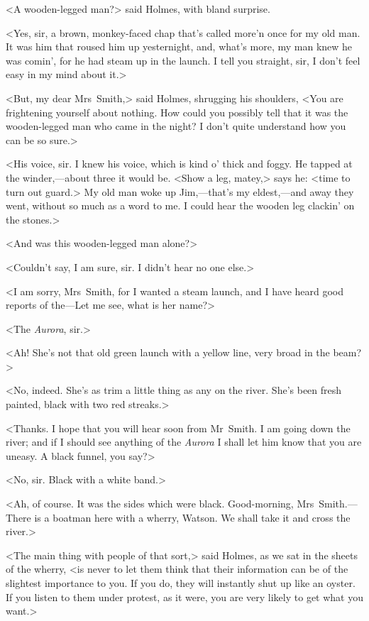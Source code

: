 <A wooden-legged man?> said Holmes, with bland surprise.

<Yes, sir, a brown, monkey-faced chap that's called more'n once for my old man. It was him that roused him up yesternight, and, what's more, my man knew he was comin', for he had steam up in the launch. I tell you straight, sir, I don't feel easy in my mind about it.>

<But, my dear Mrs~Smith,> said Holmes, shrugging his shoulders, <You are frightening yourself about nothing. How could you possibly tell that it was the wooden-legged man who came in the night? I don't quite understand how you can be so sure.>

<His voice, sir. I knew his voice, which is kind o' thick and foggy. He tapped at the winder,—about three it would be. <Show a leg, matey,> says he: <time to turn out guard.> My old man woke up Jim,—that's my eldest,—and away they went, without so much as a word to me. I could hear the wooden leg clackin' on the stones.>

<And was this wooden-legged man alone?>

<Couldn't say, I am sure, sir. I didn't hear no one else.>

<I am sorry, Mrs~Smith, for I wanted a steam launch, and I have heard good reports of the—Let me see, what is her name?>

<The \textit{Aurora}, sir.>

<Ah! She's not that old green launch with a yellow line, very broad in the beam?>

<No, indeed. She's as trim a little thing as any on the river. She's been fresh painted, black with two red streaks.>

<Thanks. I hope that you will hear soon from Mr~Smith. I am going down the river; and if I should see anything of the \textit{Aurora} I shall let him know that you are uneasy. A black funnel, you say?>

<No, sir. Black with a white band.>

<Ah, of course. It was the sides which were black. Good-morning, Mrs~Smith.—There is a boatman here with a wherry, Watson. We shall take it and cross the river.>

<The main thing with people of that sort,> said Holmes, as we sat in the sheets of the wherry, <is never to let them think that their information can be of the slightest importance to you. If you do, they will instantly shut up like an oyster. If you listen to them under protest, as it were, you are very likely to get what you want.>

